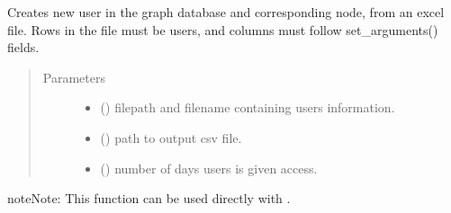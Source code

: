 \documentclass[letterpaper,10pt,english]{sphinxmanual}
\begin{document}
\begin{fulllineitems}
\label{\detokenize{_autosummary/graphdb_builder.builder:graphdb_builder.builder.create_user.create_user_from_file}}
Creates new user in the graph database and corresponding node, from an excel file.     Rows in the file must be users, and columns must follow set\_arguments() fields.
\begin{quote}\begin{description}
\item[{Parameters}] \leavevmode\begin{itemize}
\item {} 
 () \textendash{} filepath and filename containing users information.

\item {} 
 () \textendash{} path to output csv file.

\item {} 
 () \textendash{} number of days users is given access.

\end{itemize}

\end{description}\end{quote}

\begin{sphinxadmonition}{note}{Note:}
This function can be used directly with  .
\end{sphinxadmonition}

\end{fulllineitems}

\end{document}
